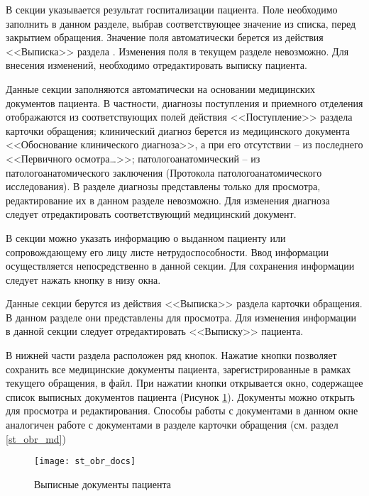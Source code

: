 В секции  указывается результат госпитализации пациента. Поле  необходимо заполнить в данном разделе, выбрав соответствующее значение из списка, перед закрытием обращения. Значение поля  автоматически берется из действия <<Выписка>> раздела . Изменения поля  в текущем разделе невозможно. Для внесения изменений, необходимо отредактировать выписку пациента.

Данные секции  заполняются автоматически на основании медицинских документов пациента. В частности, диагнозы поступления и приемного отделения отображаются из соответствующих полей действия <<Поступление>> раздела  карточки обращения; клинический диагноз берется из медицинского документа <<Обоснование клинического диагноза>>, а при его отсутствии – из последнего <<Первичного осмотра…>>; патологоанатомический – из патологоанатомического заключения (Протокола патологоанатомического исследования). В разделе  диагнозы представлены только для просмотра, редактирование их в данном разделе невозможно. Для изменения диагноза следует отредактировать соответствующий медицинский документ.

В секции  можно указать информацию о выданном пациенту или сопровождающему его лицу листе нетрудоспособности. Ввод информации осуществляется непосредственно в данной секции. Для сохранения информации следует нажать кнопку  в низу окна.

Данные секции  берутся из действия <<Выписка>> раздела  карточки обращения. В данном разделе они представлены для просмотра. Для изменения информации в данной секции следует отредактировать <<Выписку>> пациента.

В нижней части раздела  расположен ряд кнопок. Нажатие кнопки   позволяет сохранить все медицинские документы пациента, зарегистрированные в рамках текущего обращения, в файл. При нажатии кнопки  открывается окно, содержащее список выписных документов пациента (Рисунок \ref{img_st_obr_docs}). Документы можно открыть для просмотра и редактирования. Способы работы с документами в данном окне аналогичен работе с документами в разделе  карточки обращения (см. раздел \ref{st_obr_md})

\begin{figure}[ht]\centering
   \texttt{[image: st\_obr\_docs]}
   \caption{Выписные документы пациента}
   \label{img_st_obr_docs}
\end{figure}
 
